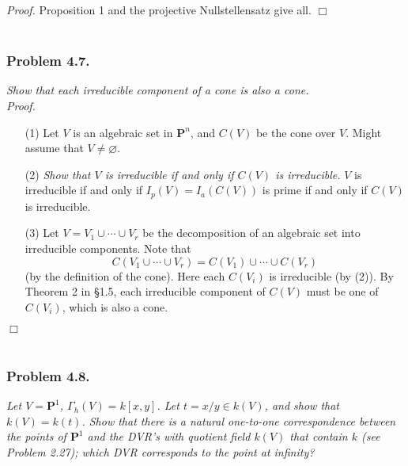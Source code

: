 \documentclass{article}
\begin{document}
\emph{Proof.}
  Proposition 1 and the projective Nullstellensatz give all.
$\Box$ \\\\






\subsubsection*{Problem 4.7.}
\emph{Show that each irreducible component of a cone is also a cone.} \\



\emph{Proof.}
\begin{enumerate}
\item[(1)]
  Let $V$ is an algebraic set in $\mathbf{P}^n$, and $C(V)$ be the cone over $V$.
  Might assume that $V \neq \varnothing$.

\item[(2)]
  \emph{Show that $V$ is irreducible if and only if $C(V)$ is irreducible.}
  $V$ is irreducible
  if and only if $I_p(V) = I_a(C(V))$ is prime
  if and only if $C(V)$ is irreducible.

\item[(3)]
  Let $V = V_1 \cup \cdots \cup V_r$ be the decomposition of an algebraic set
  into irreducible components.
  Note that
  \[
    C(V_1 \cup \cdots \cup V_r) = C(V_1) \cup \cdots \cup C(V_r)
  \]
  (by the definition of the cone).
  Here each $C(V_i)$ is irreducible (by (2)).
  By Theorem 2 in \S 1.5, each irreducible component of $C(V)$
  must be one of $C(V_i)$, which is also a cone.
\end{enumerate}
$\Box$ \\\\






\subsubsection*{Problem 4.8.}
\emph{Let $V = \mathbf{P}^{1}$, $\Gamma_h(V) = k[x,y]$.
Let $t = x/y \in k(V)$, and show that $k(V) = k(t)$.
Show that there is a natural one-to-one correspondence between the points of $\mathbf{P}^{1}$
and the DVR’s with quotient field $k(V)$ that contain $k$ (see Problem 2.27);
which DVR corresponds to the point at infinity?} \\
\end{document}
